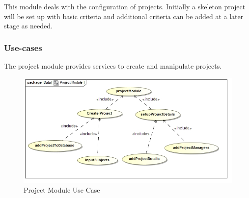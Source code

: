 This module deals with the configuration of projects. Initially a skeleton project will be set up with basic criteria 
and additional criteria can be added at a later stage as needed.
\subsubsection{Use-cases}
The project module provides services to create and manipulate projects.\par
\begin{figure}[h]
    \centering
    \includegraphics[width=15cm]{./graphics/projectModuleUseCase.jpg}
    \caption{Project Module Use Case}
\end{figure}
    
